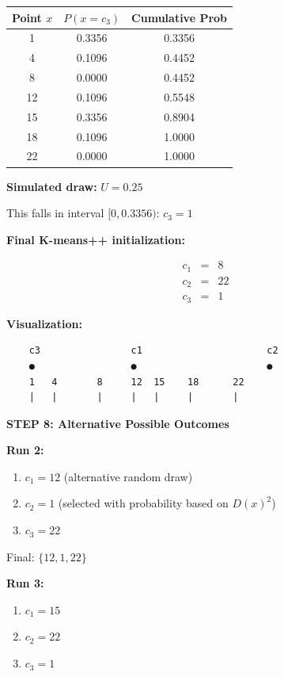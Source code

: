 \documentclass[12pt]{article}
\begin{document}
\begin{solution}
\begin{center}
\begin{tabular}{c|c|c}
Point $x$ & $P(x = c_3)$ & Cumulative Prob \\
\hline
1 & 0.3356 & 0.3356 \\
4 & 0.1096 & 0.4452 \\
8 & 0.0000 & 0.4452 \\
12 & 0.1096 & 0.5548 \\
15 & 0.3356 & 0.8904 \\
18 & 0.1096 & 1.0000 \\
22 & 0.0000 & 1.0000 \\
\end{tabular}
\end{center}

\textbf{Simulated draw:} $U = 0.25$

This falls in interval $[0, 0.3356)$: $c_3 = 1$

\textbf{Final K-means++ initialization:}

\[
\boxed{
\begin{array}{rcl}
c_1 &=& 8 \\
c_2 &=& 22 \\
c_3 &=& 1
\end{array}
}
\]

\textbf{Visualization:}

\begin{verbatim}
    c3                c1                      c2
    ●                 ●                       ●
    1   4       8     12  15    18      22
    |   |       |     |   |     |       |
\end{verbatim}

\textbf{STEP 8: Alternative Possible Outcomes}

\textbf{Run 2:}
\begin{enumerate}
    \item $c_1 = 12$ (alternative random draw)
    \item $c_2 = 1$ (selected with probability based on $D(x)^2$)
    \item $c_3 = 22$
\end{enumerate}

Final: $\{12, 1, 22\}$

\textbf{Run 3:}
\begin{enumerate}
    \item $c_1 = 15$
    \item $c_2 = 22$
    \item $c_3 = 1$
\end{enumerate}


\end{solution}
\end{document}
